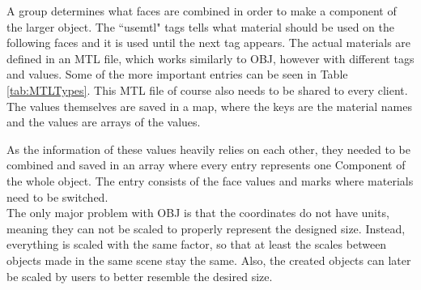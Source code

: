A group determines what faces are combined in order to make a component of the larger object. The ``usemtl" tags tells what material should be used on the following faces and it is used until the next tag appears. The actual materials are defined in an \acs{MTL} file, which works similarly to OBJ, however with different tags and values\cite{bib:MTL}. Some of the more important entries can be seen in Table \ref{tab:MTLTypes}. This \acs{MTL} file of course also needs to be shared to every client. The values themselves are saved in a map, where the keys are the material names and the values are arrays of the values.

\begin{table}[htbp]
	\centering 
	\caption[MTL Types]{Example types in MTL format}
	\label{tab:MTLTypes}
\end{table}

As the information of these values heavily relies on each other, they needed to be combined and saved in an array where every entry represents one Component of the whole object. The entry consists of the face values and marks where materials need to be switched.\\
The only major problem with OBJ is that the coordinates do not have units, meaning they can not be scaled to properly represent the designed size. Instead, everything is scaled with the same factor, so that at least the scales between objects made in the same scene stay the same. Also, the created objects can later be scaled by users to better resemble the desired size.

